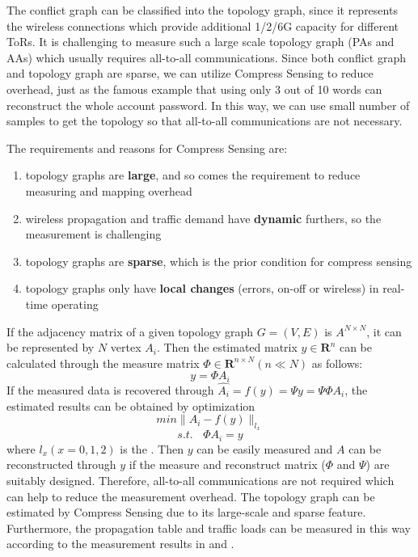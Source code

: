 \documentclass[journal,onecolumn,11pt]{IEEEtran}
\begin{document}
The conflict graph can be classified into the topology graph, since it represents the wireless connections which provide additional 1/2/6G capacity for different ToRs. It is challenging to measure such a large scale topology graph (PAs and AAs) which usually requires all-to-all communications. Since both conflict graph \cite{Halperin:2011:ADC:2018436.2018442} and topology graph \cite{Chen:2010:GAA:1851182.1851190} are sparse, we can utilize Compress Sensing to reduce overhead, just as the famous example that using only 3 out of 10 words can reconstruct the whole account password. In this way, we can use small number of samples to get the topology so that all-to-all communications are not necessary.

The requirements and reasons for Compress Sensing are:
\begin{enumerate}
  \item topology graphs are \textbf{large}, and so comes the requirement to reduce measuring and mapping overhead
  \item wireless propagation and traffic demand have \textbf{dynamic} furthers, so the measurement is challenging
  \item topology graphs are \textbf{sparse}, which is the prior condition for compress sensing
  \item topology graphs only have \textbf{local changes} (errors, on-off or wireless) in real-time operating
\end{enumerate}

If the adjacency matrix of a given topology graph $G=(V,E)$ is $A^{N\times N}$, it can be represented by $N$ vertex $A_i$. Then the estimated matrix $\hat{y}\in \textbf{R}^n$ can be calculated through the measure matrix $\Phi\in \textbf{R}^{n\times N} (n\ll N)$ as follows:
\begin{equation}
 y=\Phi A_i
 \label{estimation}
\end{equation}
If the measured data is recovered through $\hat{A_i}=f(y)=\Psi y=\Psi\Phi A_i$, the estimated results can be obtained by optimization
\begin{equation}
 min \parallel A_i-f(y) \parallel_{l_x}
 \label{recover1}
\end{equation}
\begin{equation}
 s.t.~~~~\Phi A_i = y
 \label{recover2}
\end{equation}
where $l_x (x=0,1,2)$ is the . Then $y$ can be easily measured and $A$ can be reconstructed through $y$ if the measure and reconstruct matrix ($\Phi$ and $\Psi$) are suitably designed. Therefore, all-to-all communications are not required which can help to reduce the measurement overhead. The topology graph can be estimated by Compress Sensing due to its large-scale and sparse feature. Furthermore, the propagation table and traffic loads can be measured in this way according to the measurement results in \cite{Halperin:2011:ADC:2018436.2018442} and \cite{Greenberg:2009:VSF:1592568.1592576}.
\end{document}
